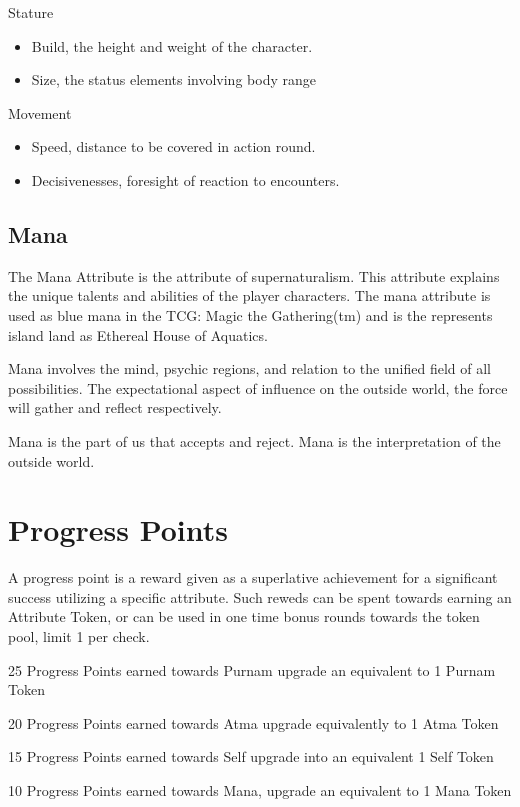 \documentclass{article}
\begin{document}
Stature
\begin{itemize}
\item Build, the height and weight of the character.
\item Size, the status elements involving body range
\end{itemize}

Movement
\begin{itemize}
\item Speed, distance to be covered in action round.
\item Decisivenesses, foresight of reaction to encounters.
\end{itemize}

\subsection{Mana}

The Mana Attribute is the attribute of supernaturalism. This attribute explains the unique talents and abilities of the player characters. The mana attribute is used as blue mana in the TCG: Magic the Gathering(tm) and is the represents island land as Ethereal House of Aquatics.

Mana involves the mind, psychic regions, and relation to the unified field of all possibilities. The expectational aspect of influence on the outside world, the force will gather and reflect respectively.

Mana is the part of us that accepts and reject. Mana is the interpretation of the outside world.

\section{Progress Points}

A progress point is a reward given as a superlative achievement for a significant success utilizing a specific attribute. Such reweds can be spent towards earning an Attribute Token, or can be used in one time bonus rounds towards the token pool, limit 1 per check.

25 Progress Points earned towards Purnam upgrade an equivalent to 1 Purnam Token

20 Progress Points earned towards Atma upgrade equivalently to 1 Atma Token

15 Progress Points earned towards Self upgrade into an equivalent 1 Self Token

10 Progress Points earned towards Mana, upgrade an equivalent to 1 Mana Token
\end{document}
